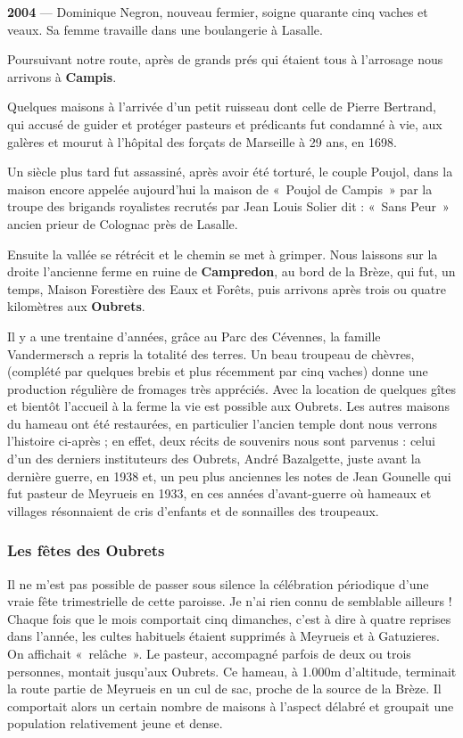 \textbf{2004} --- Dominique Negron, nouveau fermier, soigne quarante cinq vaches et veaux. Sa femme travaille dans une boulangerie à Lasalle.

Poursuivant notre route, après de grands prés qui étaient tous à l’arrosage nous arrivons à
\textbf{Campis}.

Quelques maisons à l’arrivée d’un petit ruisseau dont celle de Pierre Bertrand, qui accusé de
guider et protéger pasteurs et prédicants fut condamné à vie, aux galères et mourut à l’hôpital
des forçats de Marseille à 29 ans, en 1698.

Un siècle plus tard fut assassiné, après avoir été torturé, le couple Poujol, dans la maison
encore appelée aujourd’hui la maison de «~Poujol de Campis~» par la troupe des brigands
royalistes recrutés par Jean Louis Solier dit : «~Sans Peur~» ancien prieur de Colognac près de
Lasalle.

Ensuite la vallée se rétrécit et le chemin se met à grimper. Nous laissons sur la droite
l’ancienne ferme en ruine de \textbf{Campredon}, au bord de la Brèze, qui fut, un temps, Maison
Forestière des Eaux et Forêts, puis arrivons après trois ou quatre kilomètres aux \textbf{Oubrets}.

Il y a une trentaine d’années, grâce au Parc des Cévennes, la famille Vandermersch a repris la
totalité des terres. Un beau troupeau de chèvres, (complété par quelques brebis et plus
récemment par cinq vaches) donne une production régulière de fromages très appréciés.
Avec la location de quelques gîtes et bientôt l’accueil à la ferme la vie est possible aux
Oubrets. Les autres maisons du hameau ont été restaurées, en particulier l’ancien temple dont
nous verrons l’histoire ci-après ; en effet, deux récits de souvenirs nous sont parvenus : celui
d’un des derniers instituteurs des Oubrets, André Bazalgette, juste avant la dernière guerre,
en 1938 et, un peu plus anciennes les notes de Jean Gounelle qui fut pasteur de Meyrueis en
1933, en ces années d’avant-guerre où hameaux et villages résonnaient de cris d’enfants et de
sonnailles des troupeaux.

\subsubsection{Les fêtes des Oubrets}

Il ne m’est pas possible de passer sous silence la célébration périodique d’une vraie
fête trimestrielle de cette paroisse. Je n’ai rien connu de semblable ailleurs ! Chaque
fois que le mois comportait cinq dimanches, c’est à dire à quatre reprises dans
l’année, les cultes habituels étaient supprimés à Meyrueis et à Gatuzieres. On affichait
«~relâche~». Le pasteur, accompagné parfois de deux ou trois personnes, montait
jusqu’aux Oubrets. Ce hameau, à 1.000m d’altitude, terminait la route partie de
Meyrueis en un cul de sac, proche de la source de la Brèze. Il comportait alors un
certain nombre de maisons à l’aspect délabré et groupait une population relativement
jeune et dense.

